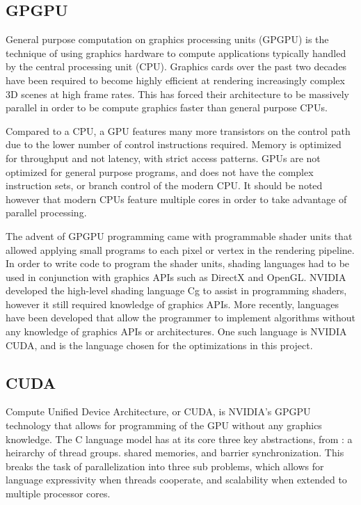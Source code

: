 	\subsection{GPGPU}
General purpose computation on graphics processing units (GPGPU) is the technique of using graphics hardware to compute applications typically handled by the central processing unit (CPU). Graphics cards over the past two decades have been required to become highly efficient at rendering increasingly complex 3D scenes at high frame rates. This has forced their architecture to be massively parallel in order to be compute graphics faster than general purpose CPUs.

Compared to a CPU, a GPU features many more transistors on the control path due to the lower number of control instructions required. Memory is optimized for throughput and not latency, with strict access patterns. GPUs are not optimized for general purpose programs, and does not have the complex instruction sets, or branch control of the modern CPU. It should be noted however that modern CPUs feature multiple cores in order to take advantage of parallel processing. 

The advent of GPGPU programming came with programmable shader units that allowed applying small programs to each pixel or vertex in the rendering pipeline. In order to write code to program the shader units, shading languages had to be used in conjunction with graphics APIs such as DirectX and OpenGL. NVIDIA developed the high-level shading language Cg to assist in programming shaders, however it still required knowledge of graphics APIs. More recently, languages have been developed that allow the programmer to implement algorithms without any knowledge of graphics APIs or architectures. One such language is NVIDIA CUDA, and is the language chosen for the optimizations in this project.

	\subsection{CUDA}
Compute Unified Device Architecture, or CUDA, is NVIDIA's GPGPU technology that allows for programming of the GPU without any graphics knowledge. The C language model has at its core three key abstractions, from \cite{cuda}: a heirarchy of thread groups. shared memories, and barrier synchronization. This breaks the task of parallelization into three sub problems, which allows for language expressivity when threads cooperate, and scalability when extended to multiple processor cores.

